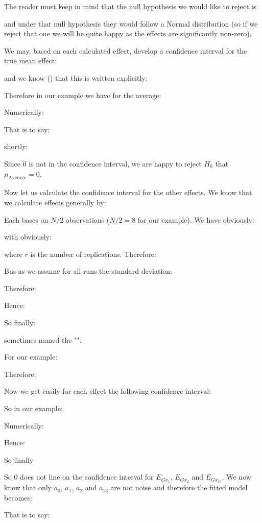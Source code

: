 	The reader must keep in mind that the null hypothesis we would like to reject is:
	
	and under that null hypothesis they would follow a Normal distribution (so if we reject that one we will be quite happy as the effects are significantly non-zero).
	
	We may, based on each calculated effect, develop a confidence interval for the true mean effect:
	
	and we know () that this is written explicitly:
	
	Therefore in our example we have for the average:
	
	Numerically:
	
	That is to say:
	
	shortly:
	
	Since $0$ is not in the confidence interval, we are happy to reject $H_0$ that $\mu_\text{Average}=0$.
	
	Now let us calculate the confidence interval for the other effects. We know that we calculate effects generally by:
	
	Each bases on $N/2$ observations ($N/2=8$ for our example). We have obviously:
	
	with obviously:
	
	where $r$ is the number of replications. Therefore:
	
	Bus as we assume for all runs the standard deviation:
	
	Therefore:
	
	Hence:
	
	So finally:
	
	sometimes named the "\NewTerm{}".
	
	For our example:
	
	Therefore:
	
	Now we get easily for each effect the following confidence interval:
	
	So in our example:
	
	Numerically:
	
	Hence:
	
	So finally
	
	So $0$ does not line on the confidence interval for $E_{Gx_1}$, $E_{Gx_2}$ and $E_{Gx_{13}}$. We now know that only $a_0$, $a_1$, $a_2$ and $a_{13}$ are not noise and therefore the fitted model becomes:
	
	That is to say:
	
